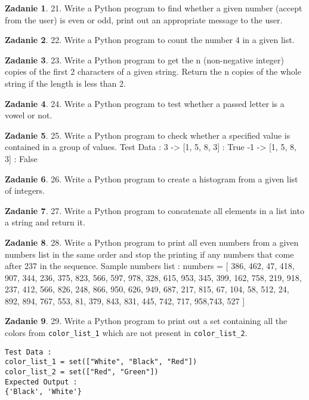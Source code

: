 \documentclass[11pt]{article}
\theoremstyle{definition}
\newtheorem{zadanie}{Zadanie}
\begin{document}
\begin{zadanie}
21. Write a Python program to find whether a given number (accept from the user) is even or odd, print out an appropriate message to the user.
\end{zadanie}

\begin{zadanie}
22. Write a Python program to count the number 4 in a given list.
\end{zadanie}

\begin{zadanie}
23. Write a Python program to get the n (non-negative integer) copies of the first 2 characters of a given string. Return the n copies of the whole string if the length is less than 2.
\end{zadanie}

\begin{zadanie}
24. Write a Python program to test whether a passed letter is a vowel or not.
\end{zadanie}

\begin{zadanie}
25. Write a Python program to check whether a specified value is contained in a group of values.
Test Data :
3 -> [1, 5, 8, 3] : True
-1 -> [1, 5, 8, 3] : False
\end{zadanie}

\begin{zadanie}
26. Write a Python program to create a histogram from a given list of integers.
\end{zadanie}

\begin{zadanie}
27. Write a Python program to concatenate all elements in a list into a string and return it.
\end{zadanie}

\begin{zadanie}
28. Write a Python program to print all even numbers from a given numbers list in the same order and stop the printing if any numbers that come after 237 in the sequence.
Sample numbers list :
numbers = [
386, 462, 47, 418, 907, 344, 236, 375, 823, 566, 597, 978, 328, 615, 953, 345,
399, 162, 758, 219, 918, 237, 412, 566, 826, 248, 866, 950, 626, 949, 687, 217,
815, 67, 104, 58, 512, 24, 892, 894, 767, 553, 81, 379, 843, 831, 445, 742, 717,
958,743, 527
]
\end{zadanie}

\begin{zadanie}
29. Write a Python program to print out a set containing all the colors from \texttt{color\_list\_1} which are not present in \texttt{color\_list\_2}.
\begin{verbatim}
Test Data :
color_list_1 = set(["White", "Black", "Red"])
color_list_2 = set(["Red", "Green"])
Expected Output :
{'Black', 'White'}
\end{verbatim}
\end{zadanie}
\end{document}
